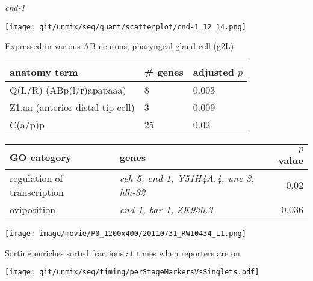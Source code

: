 \documentclass[serif,9pt]{beamer}
\begin{document}
\begin{frame}{{\em cnd-1}}
\begin{minipage}{0.4\textwidth}
\texttt{[image: git/unmix/seq/quant/scatterplot/cnd-1\_12\_14.png]}
\end{minipage}
\begin{minipage}{0.58\textwidth}

{\small Expressed in various AB neurons, pharyngeal gland cell (g2L)}

\begin{table}[!tbp]\scriptsize
\begin{tabular}{lll}
anatomy term & \# genes & adjusted $p$ \\
\hline
Q(L/R) {\tiny (ABp(l/r)apapaaa)} & 8 & 0.003 \\
Z1.aa {\tiny (anterior distal tip cell)} & 3 & 0.009 \\
C(a/p)p & 25 & 0.02 \\
\end{tabular}
\end{table}
\end{minipage}

\begin{table}\footnotesize
\begin{tabular}{llr}
GO category & genes & $p$ value \\
\hline
regulation of transcription & {\em ceh-5, cnd-1, Y51H4A.4, unc-3, hlh-32} & 0.02 \\
oviposition & {\em cnd-1, bar-1, ZK930.3} & 0.036 \\
\end{tabular}
\end{table}

\texttt{[image: image/movie/P0\_1200x400/20110731\_RW10434\_L1.png]}

\end{frame}

\begin{frame}{Sorting enriches sorted fractions at times when reporters are on}

\begin{centering}
\texttt{[image: git/unmix/seq/timing/perStageMarkersVsSinglets.pdf]}
\end{centering}

\end{frame}
\end{document}
